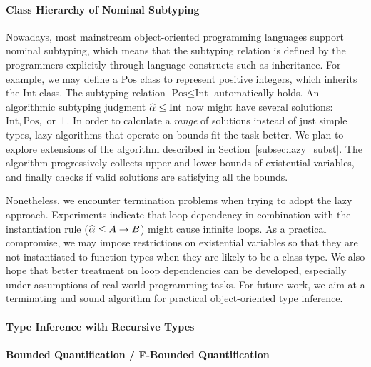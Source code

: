 \paragraph{Class Hierarchy of Nominal Subtyping}
Nowadays, most mainstream object-oriented programming languages
support nominal subtyping,
which means that the subtyping relation is defined by the programmers explicitly
through language constructs such as inheritance.
For example, we may define a $\text{Pos}$ class to represent positive integers,
which inherits the $\text{Int}$ class.
The subtyping relation $\text{Pos} \le \text{Int}$ automatically holds.
An algorithmic subtyping judgment $\al \le \text{Int}$
now might have several solutions: $\text{Int}, \text{Pos},$ or $\bot$.
In order to calculate a \emph{range} of solutions instead of
just simple types,
lazy algorithms that operate on bounds fit the task better.
We plan to explore extensions of the algorithm described in Section~\ref{subsec:lazy_subst}.
The algorithm progressively collects upper and lower bounds of existential variables,
and finally checks if valid solutions are satisfying all the bounds.

Nonetheless, we encounter termination problems when trying to adopt the lazy approach.
Experiments indicate that loop dependency in combination with the
instantiation rule ($\al \le A \to B$) might cause infinite loops.
As a practical compromise,
we may impose restrictions on existential variables
so that they are not instantiated to function types
when they are likely to be a class type.
We also hope that better treatment on loop dependencies can be
developed, especially under assumptions of real-world programming tasks.
For future work,
we aim at a terminating and sound algorithm for practical object-oriented type inference.


\paragraph{Type Inference with Recursive Types}



\paragraph{Bounded Quantification / F-Bounded Quantification}

